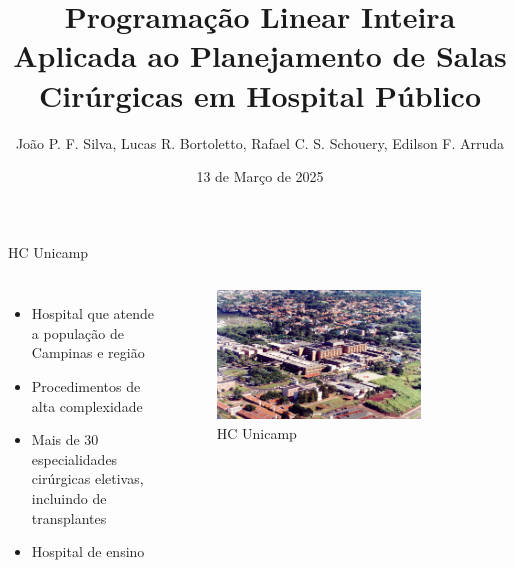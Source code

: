\documentclass[10pt]{beamer}
\title{Programação Linear Inteira Aplicada ao Planejamento de Salas Cirúrgicas em Hospital Público}
\subtitle{João P. F. Silva, Lucas R. Bortoletto, Rafael C. S. Schouery, Edilson F. Arruda}
\date{13 de Março de 2025}
\begin{document}
\maketitle

\begin{frame}{HC Unicamp}
    \begin{columns}
        \begin{itemize}
            \setlength\itemsep{1em}
            \item<2-> Hospital que atende a população de Campinas e região
            \item<3-> Procedimentos de alta complexidade
            \item<4-> Mais de 30 especialidades cirúrgicas eletivas, incluindo de transplantes
            \item<5-> Hospital de ensino
        \end{itemize}
        \begin{figure}
            \centering
            \includegraphics[width=0.8\textwidth]{images/aereahc.jpg}
            \caption{HC Unicamp}
        \end{figure}
    \end{columns}
\end{frame}
\end{document}

